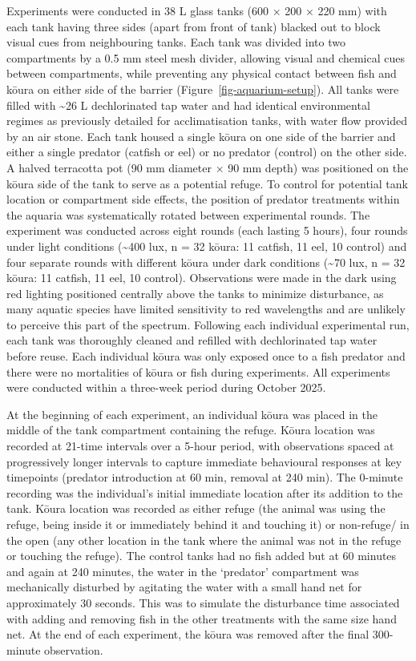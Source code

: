 \documentclass[
  12pt,
  a4paper,
  oneside]{scrbook}
\begin{document}
Experiments were conducted in 38 L glass tanks (600 × 200 × 220 mm) with
each tank having three sides (apart from front of tank) blacked out to
block visual cues from neighbouring tanks. Each tank was divided into
two compartments by a 0.5 mm steel mesh divider, allowing visual and
chemical cues between compartments, while preventing any physical
contact between fish and kōura on either side of the barrier
(Figure~\ref{fig-aquarium-setup}). All tanks were filled with
\textasciitilde26 L dechlorinated tap water and had identical
environmental regimes as previously detailed for acclimatisation tanks,
with water flow provided by an air stone. Each tank housed a single
kōura on one side of the barrier and either a single predator (catfish
or eel) or no predator (control) on the other side. A halved terracotta
pot (90 mm diameter × 90 mm depth) was positioned on the kōura side of
the tank to serve as a potential refuge. To control for potential tank
location or compartment side effects, the position of predator
treatments within the aquaria was systematically rotated between
experimental rounds. The experiment was conducted across eight rounds
(each lasting 5 hours), four rounds under light conditions
(\textasciitilde400 lux, n = 32 kōura: 11 catfish, 11 eel, 10 control)
and four separate rounds with different kōura under dark conditions
(\textasciitilde70 lux, n = 32 kōura: 11 catfish, 11 eel, 10 control).
Observations were made in the dark using red lighting positioned
centrally above the tanks to minimize disturbance, as many aquatic
species have limited sensitivity to red wavelengths and are unlikely to
perceive this part of the spectrum. Following each individual
experimental run, each tank was thoroughly cleaned and refilled with
dechlorinated tap water before reuse. Each individual kōura was only
exposed once to a fish predator and there were no mortalities of kōura
or fish during experiments. All experiments were conducted within a
three-week period during October 2025.

At the beginning of each experiment, an individual kōura was placed in
the middle of the tank compartment containing the refuge. Kōura location
was recorded at 21-time intervals over a 5-hour period, with
observations spaced at progressively longer intervals to capture
immediate behavioural responses at key timepoints (predator introduction
at 60 min, removal at 240 min). The 0-minute recording was the
individual's initial immediate location after its addition to the tank.
Kōura location was recorded as either refuge (the animal was using the
refuge, being inside it or immediately behind it and touching it) or
non-refuge/ in the open (any other location in the tank where the animal
was not in the refuge or touching the refuge). The control tanks had no
fish added but at 60 minutes and again at 240 minutes, the water in the
`predator' compartment was mechanically disturbed by agitating the water
with a small hand net for approximately 30 seconds. This was to simulate
the disturbance time associated with adding and removing fish in the
other treatments with the same size hand net. At the end of each
experiment, the kōura was removed after the final 300-minute
observation.
\end{document}
